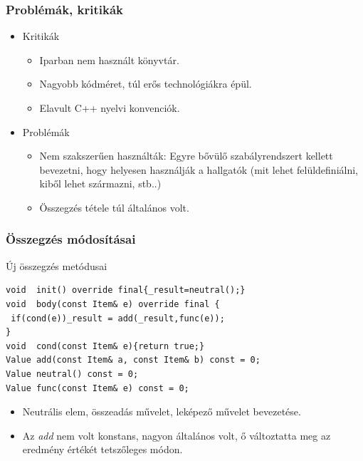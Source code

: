 \documentclass[11pt]{beamer}
\begin{document}
\begin{frame}
	\frametitle{Problémák, kritikák}
	\begin{itemize}
		\item Kritikák
		\begin{itemize}
			\item Iparban nem használt könyvtár.
			\item Nagyobb kódméret, túl erős technológiákra épül.
			\item Elavult C++ nyelvi konvenciók.
		\end{itemize}
		\item Problémák
		\begin{itemize}
			\item Nem szakszerűen használták: Egyre bővülő szabályrendszert kellett  bevezetni, hogy helyesen használják a hallgatók (mit lehet felüldefiniálni, kiből lehet származni, stb..)
			\item Összegzés tétele túl általános volt.
		\end{itemize}
	\end{itemize}
\end{frame}

\begin{frame}[fragile]
	\frametitle{Összegzés módosításai}
	\begin{block}{Új összegzés metódusai}
	\begin{lstlisting}[basicstyle=\small]
void  init() override final{_result=neutral();}
void  body(const Item& e) override final {
 if(cond(e))_result = add(_result,func(e));
}
void  cond(const Item& e){return true;}
Value add(const Item& a, const Item& b) const = 0;
Value neutral() const = 0;
Value func(const Item& e) const = 0;

	\end{lstlisting}
	\end{block}
	
	\begin{itemize}
	\item Neutrális elem, összeadás művelet, leképező művelet bevezetése.
	\item Az \textit{add} nem volt konstans, nagyon általános volt, ő változtatta meg az eredmény értékét tetszőleges módon.
	\end{itemize}
\end{frame}
\end{document}
